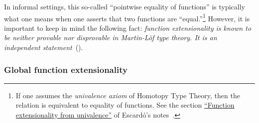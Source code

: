 \ccpad
In informal settings, this so-called ``pointwise equality of functions'' is typically what one means when one
asserts that two functions are ``equal.''\footnote{%
If one assumes the \emph{univalence axiom} of Homotopy Type Theory, then the  relation is equivalent to equality of functions. See the section \href{https://www.cs.bham.ac.uk/~mhe/HoTT-UF-in-Agda-Lecture-Notes/HoTT-UF-Agda.html\#funextfromua}{``Function extensionality from univalence''} of Escard\'o's notes~\cite{MHE}.}
However, it is important to keep in mind the following fact: \textit{function extensionality is known to be neither provable nor disprovable in Martin-Löf type theory. It is an independent statement}~(\cite{MHE}).

\subsubsection{Global function extensionality}\label{sec:glob-funct-extens}

